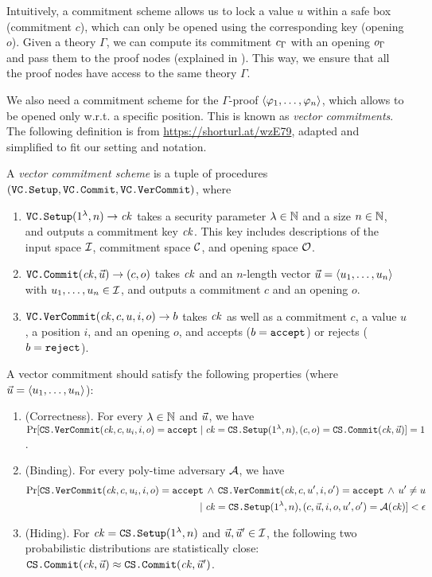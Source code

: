 \documentclass{article}
\begin{document}
Intuitively, a commitment scheme allows us to lock a value $u$
within a safe box (commitment $c$),
which can only be opened using the corresponding key (opening $o$). 
Given a theory $\Gamma$, we can compute its commitment $c_\Gamma$
with an opening $o_\Gamma$ and pass them to the proof nodes
(explained in ).
This way, we ensure that all the proof nodes have access to the same
theory $\Gamma$. 

We also need a commitment scheme for the $\Gamma$-proof $\left\langle \varphi_1,\dots,\varphi_n \right\rangle$,
which allows to be opened only w.r.t. a specific position. 
This is known as \emph{vector commitments}. 
The following definition is from \url{https://shorturl.at/wzE79}, 
adapted and simplified 
to fit our setting and notation. 
\begin{definition}
A \emph{vector commitment scheme} is a tuple of procedures
$(\textnormal{\texttt{VC.Setup}}, \textnormal{\texttt{VC.Commit}}, \textnormal{\texttt{VC.VerCommit}})$, where
\begin{enumerate}
\item $\textnormal{\texttt{VC.Setup}}(1^\lambda, n) \to \mathit{ck}$ 
      takes a security parameter $\lambda \in \mathbb{N}$
      and a size $n \in \mathbb{N}$, 
      and outputs a commitment key $\mathit{ck}$. This key includes descriptions of
      the input space
      $\mathcal{I}$,  commitment space $\mathcal{C}$, and opening space $\mathcal{O}$. 
\item $\textnormal{\texttt{VC.Commit}}(\mathit{ck}, \vec{u}) \to  (c, o)$ takes $\mathit{ck}$ and 
      an $n$-length vector $\vec{u} = \left\langle u_1,\dots,u_n \right\rangle$ with $u_1,\dots,u_n \in \mathcal{I}$,
      and outputs a commitment $c$ and an opening $o$.
\item $\textnormal{\texttt{VC.VerCommit}}(\mathit{ck}, c, u, i, o) \to b$ takes $\mathit{ck}$ as well as
      a commitment $c$, a value $u$, a position $i$, and an opening $o$,
      and accepts ($b = \textnormal{\texttt{accept}}$) or rejects ($b = \textnormal{\texttt{reject}}$).  
\end{enumerate}
A vector commitment should satisfy the following properties
(where $\vec{u} = \left\langle u_1,\dots,u_n \right\rangle$):
\begin{enumerate}
\item (Correctness).
      For every $\lambda \in \mathbb{N}$ and $\vec{u}$, we have
      $\Pr[\textnormal{\texttt{CS.VerCommit}}(\mathit{ck}, c, u_i, i, o) = \textnormal{\texttt{accept}} \mid \mathit{ck} = \textnormal{\texttt{CS.Setup}}(1^\lambda, n), (c,o) = \textnormal{\texttt{CS.Commit}}(\mathit{ck}, \vec{u})] = 1$. 
\item (Binding).
      For every poly-time adversary $\mathcal{A}$, we have
      \begin{align*}
           \Pr[\textnormal{\texttt{CS.VerCommit}}(\mathit{ck}, c, u_i, i, o) = \textnormal{\texttt{accept}} \,\land\,
           \textnormal{\texttt{CS.VerCommit}}(\mathit{ck}, c, u', i, o') = \textnormal{\texttt{accept}} \,\land\, u' \neq u
           \\ \mid
           \mathit{ck} = \textnormal{\texttt{CS.Setup}}(1^\lambda, n), (c,\vec{u},i, o,u',o') = \mathcal{A}(\mathit{ck})] < \epsilon
      \end{align*}
\item (Hiding). For $\mathit{ck} = \textnormal{\texttt{CS.Setup}}(1^\lambda, n)$ and $\vec{u},\vec{u}' \in \mathcal{I}$,
      the following two probabilistic distributions are statistically close:
      $\textnormal{\texttt{CS.Commit}}(\mathit{ck}, \vec{u}) \approx \textnormal{\texttt{CS.Commit}}(\mathit{ck}, \vec{u}')$. 
\end{enumerate}
\end{definition}
\end{document}
